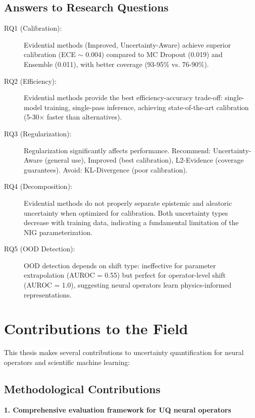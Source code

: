 \subsection{Answers to Research Questions}

\begin{description}
\item[RQ1 (Calibration):] Evidential methods (Improved, Uncertainty-Aware) achieve superior calibration (ECE $\sim$ 0.004) compared to MC Dropout (0.019) and Ensemble (0.011), with better coverage (93-95\% vs. 76-90\%).

\item[RQ2 (Efficiency):] Evidential methods provide the best efficiency-accuracy trade-off: single-model training, single-pass inference, achieving state-of-the-art calibration (5-30× faster than alternatives).

\item[RQ3 (Regularization):] Regularization significantly affects performance. Recommend: Uncertainty-Aware (general use), Improved (best calibration), L2-Evidence (coverage guarantees). Avoid: KL-Divergence (poor calibration).

\item[RQ4 (Decomposition):] Evidential methods do not properly separate epistemic and aleatoric uncertainty when optimized for calibration. Both uncertainty types decrease with training data, indicating a fundamental limitation of the NIG parameterization.

\item[RQ5 (OOD Detection):] OOD detection depends on shift type: ineffective for parameter extrapolation (AUROC = 0.55) but perfect for operator-level shift (AUROC = 1.0), suggesting neural operators learn physics-informed representations.
\end{description}

\section{Contributions to the Field}

This thesis makes several contributions to uncertainty quantification for neural operators and scientific machine learning:

\subsection{Methodological Contributions}

\textbf{1. Comprehensive evaluation framework for UQ neural operators}

